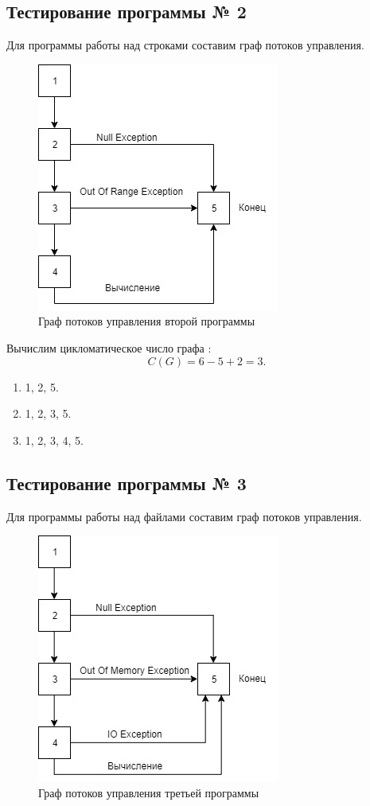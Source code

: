 \documentclass[a4paper,14pt]{extarticle}
\begin{document}
    \subsection{Тестирование программы № 2}
    Для программы работы над строками составим граф потоков управления.
    \begin{figure}[H]
        \centering
        \includegraphics[width=.4\linewidth]{StringsExecutionFlowsGraph}
        \caption{Граф потоков управления второй программы}
    \end{figure}

    Вычислим цикломатическое число графа :
    \begin{equation*}
        C(G) = 6 - 5 + 2 = 3.
    \end{equation*}
    \begin{enumerate}
        \item 1, 2, 5.
        \item 1, 2, 3, 5.
        \item 1, 2, 3, 4, 5.
    \end{enumerate}

    \subsection{Тестирование программы № 3}
    Для программы работы над файлами составим граф потоков управления.
    \begin{figure}[H]
        \centering
        \includegraphics[width=.4\linewidth]{FileExecutionFlowsGraph}
        \caption{Граф потоков управления третьей программы}
    \end{figure}
\end{document}
